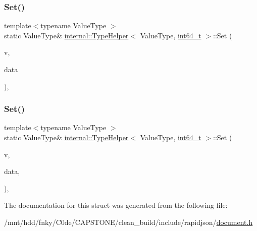 \mbox{\label{structinternal_1_1TypeHelper_3_01ValueType_00_01int64__t_01_4_a0c7b71569c12346902a396111782b12b}} 
\subsubsection{\texorpdfstring{Set()}{Set()}\hspace{0.1cm}{\footnotesize\ttfamily [1/2]}}
{\footnotesize\ttfamily template$<$typename Value\+Type $>$ \\
static Value\+Type\& \hyperlink{structinternal_1_1TypeHelper}{internal\+::\+Type\+Helper}$<$ Value\+Type, \hyperlink{stdint_8h_a414156feea104f8f75b4ed9e3121b2f6}{int64\+\_\+t} $>$\+::Set (\begin{DoxyParamCaption}\item[{Value\+Type \&}]{v,  }\item[{\hyperlink{stdint_8h_a414156feea104f8f75b4ed9e3121b2f6}{int64\+\_\+t}}]{data }\end{DoxyParamCaption})\hspace{0.3cm}{\ttfamily [inline]}, {\ttfamily [static]}}

\mbox{\label{structinternal_1_1TypeHelper_3_01ValueType_00_01int64__t_01_4_a85471fa774b4a8f4f56c191694a7f278}} 
\subsubsection{\texorpdfstring{Set()}{Set()}\hspace{0.1cm}{\footnotesize\ttfamily [2/2]}}
{\footnotesize\ttfamily template$<$typename Value\+Type $>$ \\
static Value\+Type\& \hyperlink{structinternal_1_1TypeHelper}{internal\+::\+Type\+Helper}$<$ Value\+Type, \hyperlink{stdint_8h_a414156feea104f8f75b4ed9e3121b2f6}{int64\+\_\+t} $>$\+::Set (\begin{DoxyParamCaption}\item[{Value\+Type \&}]{v,  }\item[{\hyperlink{stdint_8h_a414156feea104f8f75b4ed9e3121b2f6}{int64\+\_\+t}}]{data,  }\item[{typename Value\+Type\+::\+Allocator\+Type \&}]{ }\end{DoxyParamCaption})\hspace{0.3cm}{\ttfamily [inline]}, {\ttfamily [static]}}



The documentation for this struct was generated from the following file\+:\begin{DoxyCompactItemize}
\item 
/mnt/hdd/fnky/\+C0de/\+C\+A\+P\+S\+T\+O\+N\+E/clean\+\_\+build/include/rapidjson/\hyperlink{document_8h}{document.\+h}\end{DoxyCompactItemize}
